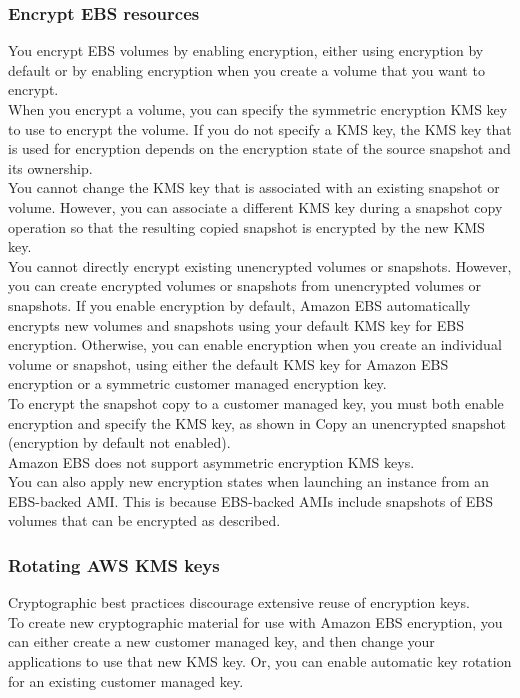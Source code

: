\documentclass[12pt, letterpaper, twoside]{article}
\begin{document}
\subsubsection{Encrypt EBS resources}
You encrypt EBS volumes by enabling encryption, either using encryption by default or by enabling encryption when you create a volume that you 
want to encrypt.\\
When you encrypt a volume, you can specify the symmetric encryption KMS key to use to encrypt the volume. If you do not specify a KMS key, 
the KMS key that is used for encryption depends on the encryption state of the source snapshot and its ownership.\\

You cannot change the KMS key that is associated with an existing snapshot or volume. However, you can associate a different KMS key during a 
snapshot copy operation so that the resulting copied snapshot is encrypted by the new KMS key.\\

You cannot directly encrypt existing unencrypted volumes or snapshots. However, you can create encrypted volumes or snapshots from unencrypted 
volumes or snapshots. If you enable encryption by default, Amazon EBS automatically encrypts new volumes and snapshots using your default KMS key 
for EBS encryption. Otherwise, you can enable encryption when you create an individual volume or snapshot, using either the default KMS key for 
Amazon EBS encryption or a symmetric customer managed encryption key.\\
To encrypt the snapshot copy to a customer managed key, you must both enable encryption and specify the KMS key, as shown in Copy an unencrypted 
snapshot (encryption by default not enabled).\\

Amazon EBS does not support asymmetric encryption KMS keys.\\

You can also apply new encryption states when launching an instance from an EBS-backed AMI. This is because EBS-backed AMIs include snapshots 
of EBS volumes that can be encrypted as described.\\

\subsubsection{Rotating AWS KMS keys}
Cryptographic best practices discourage extensive reuse of encryption keys.\\
To create new cryptographic material for use with Amazon EBS encryption, you can either create a new customer managed key, and then change 
your applications to use that new KMS key. Or, you can enable automatic key rotation for an existing customer managed key.\\
\end{document}
